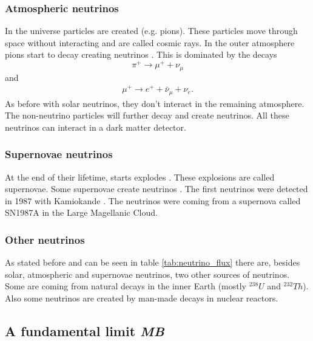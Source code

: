 \documentclass{article}
\begin{document}
\subsubsection{Atmospheric neutrinos}
In the universe particles are created (e.g. pions). These particles move through space without interacting and are called cosmic rays. In the outer atmosphere pions start to decay creating neutrinos \cite{Fukuda:1998mi,Gaisser:2016obt}. This is dominated by the decays
\begin{equation}
    \pi^+\rightarrow\mu^++\nu_\mu
\end{equation}
and
\begin{align}
    \mu^+\rightarrow e^++\bar{\nu}_\mu+\nu_e.
\end{align}
As before with solar neutrinos, they don't interact in the remaining atmosphere. The non-neutrino particles will further decay and create neutrinos. All these neutrinos can interact in a dark matter detector.

\subsubsection{Supernovae neutrinos}
At the end of their lifetime, starts explodes \cite{raffelt1996stars}. These explosions are called supernovae. Some supernovae create neutrinos \cite{Beacom:2010kk}. The first neutrinos were detected in 1987 with Kamiokande \cite{Totsuka:1988iyh}. The neutrinos were coming from a supernova called SN1987A in the Large Magellanic Cloud.

\subsubsection{Other neutrinos}
As stated before and can be seen in table \ref{tab:neutrino_flux} there are, besides solar, atmospheric and supernovae neutrinos, two other sources of neutrinos. Some are coming from natural decays in the inner Earth (mostly ${}^{238}U$ and ${}^{232}Th$). Also some neutrinos are created by man-made decays in nuclear reactors.

\subsection{A fundamental limit \small{\textit{MB}}}
\end{document}
